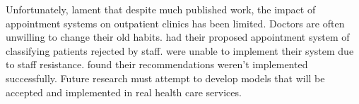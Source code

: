 Unfortunately, \citet{Cayirli} lament that despite much published work, the impact of appointment systems on outpatient clinics has been limited. Doctors are often unwilling to change their old habits. \citet{O'Keefe} had their proposed appointment system of classifying patients rejected by staff. \citet{Huarng} were unable to implement their system due to staff resistance. \citet{Bennett} found their recommendations weren't implemented successfully. Future research must attempt to develop models that will be accepted and implemented in real health care services.
